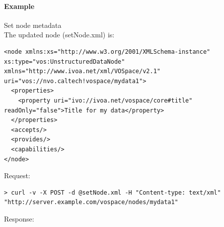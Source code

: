 \documentclass[11pt,a4paper]{ivoa}
\begin{document}
\paragraph{Example}
Set node metadata
\\[5px]
\noindent
The updated node (setNode.xml) is:
\begin{lstlisting}
<node xmlns:xs="http://www.w3.org/2001/XMLSchema-instance" xs:type="vos:UnstructuredDataNode" xmlns="http://www.ivoa.net/xml/VOSpace/v2.1" uri="vos://nvo.caltech!vospace/mydata1">
  <properties>
    <property uri="ivo://ivoa.net/vospace/core#title" readOnly="false">Title for my data</property>
  </properties>
  <accepts/>
  <provides/>
  <capabilities/>
</node>
\end{lstlisting}
Request:
\begin{lstlisting}
> curl -v -X POST -d @setNode.xml -H "Content-type: text/xml" "http://server.example.com/vospace/nodes/mydata1"
\end{lstlisting}
Response:
\end{document}
